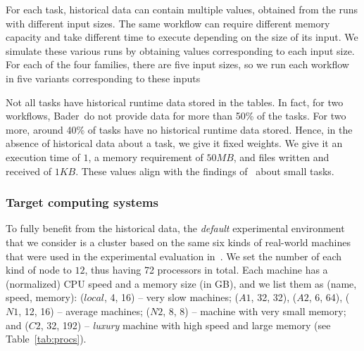 \documentclass[conference]{IEEEtran}
\newcommand{\skug}[1]{{\color{blue}[SK: #1]}}
\begin{document}
    For each task, historical data can contain multiple values, obtained from the runs with different input sizes.
    The same workflow can require different memory capacity and take different time to execute
    depending on the size of its input.
    We simulate these various runs by obtaining values corresponding to each input size.
    For each of the four families, there are five input sizes, so we run each workflow in five variants corresponding to these inputs

    Not all tasks have historical runtime data stored in the tables.
    In fact, for two workflows, Bader~\etal do not provide data for more than 50\% of the tasks.
    For two more, around 40\% of tasks have no historical runtime data stored.
    Hence, in the absence of historical data about a task, we give it fixed weights.
    We give it an execution time of $1$, a memory requirement of $50 MB$, and files written and received of $1KB$.
    These values align with the findings of~\cite{lotaru} about small tasks.
%

    \subsubsection{Target computing systems}

    To fully benefit from the historical data, the  {\em default} experimental environment
    that we consider is a cluster based on the same six
    kinds of real-world machines that were used in the experimental evaluation in~\cite{lotaru}.
    We set the number of each kind of node to $12$, thus having 72 processors in total.  %
%
    Each machine has a (normalized) CPU speed and a memory size (in GB), and we list them as (name, speed, memory):
    ($local$, 4, 16) -- very slow machines; ($A1$, 32, 32), ($A2$, 6, 64), ($N1$, 12, 16) -- average machines;
    ($N2$, 8, 8) -- machine with very small memory; and ($C2$, 32, 192) -- {\em luxury} machine with high speed and
    large memory (see Table~\ref{tab:procs}).
\end{document}
